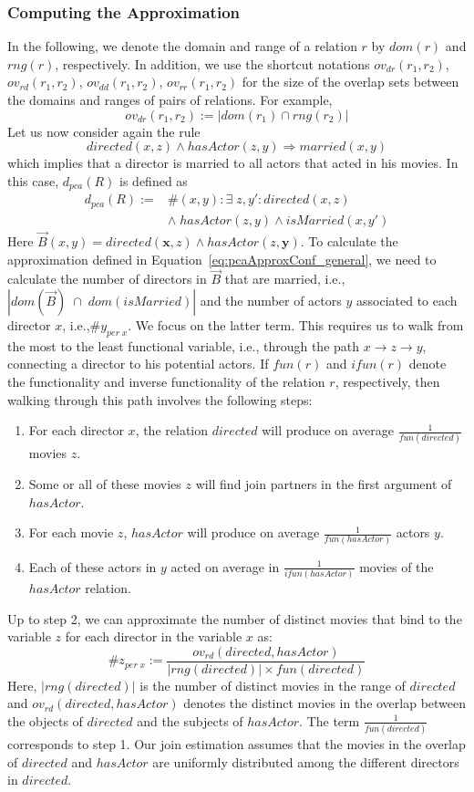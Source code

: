 \subsubsection{Computing the Approximation} \label{sec:appr}
In the following, we denote the domain and range of a relation $r$ by $dom(r)$ and $rng(r)$, respectively.
In addition, we use the shortcut notations $ov_{dr}(r_1,r_2)$, $ov_{rd}(r_1,r_2)$, $ov_{dd}(r_1,r_2)$, $ov_{rr}(r_1,r_2)$
for the size of the overlap sets between the domains and ranges
of pairs of relations. For example, \[ov_{dr}(r_1,r_2) := |dom(r_1) \cap rng(r_2)|\]
Let us now consider again the rule
\[
 directed(x,z) \wedge hasActor(z,y) \Rightarrow married(x,y)
\]
which implies that a director is married to all actors that acted in his movies.
In this case, $d_{pca}(R)$ is defined as
\[
\begin{array}{rl}
d_{pca}(R) := &\#(x,y): \exists\; z, y': directed(x,z)  \\
  &\wedge\; hasActor(z,y) \wedge isMarried(x,y') \label{eq:denomPCAExample}
\end{array}
\]
Here $\vec{B}(x, y) = directed(\bm{x},z) \wedge hasActor(z,\bm{y})$.
To calculate the approximation defined in Equation~\ref{eq:pcaApproxConf_general},
we need to calculate the number of directors in $\vec{B}$ that are married, i.e.,
$|dom(\vec{B})\;\cap\;dom(isMarried)|$ and the number of actors $y$
associated to each director $x$, i.e.,$\#y_{per\;x}$.
We focus on the latter term.
This requires us to walk from the most to the least functional variable, i.e., through the path $x \rightarrow z \rightarrow y$, connecting a director to his potential actors.
If $fun(r)$ and $ifun(r)$
denote the functionality and inverse functionality of the relation $r$, respectively, then
walking through this path involves the following steps:
\begin{enumerate} \itemsep +0.3ex
 \item For each director $x$, the relation $directed$ will produce on average $\frac{1}{fun(directed)}$ movies $z$.
 \item Some or all of these movies $z$ will find join partners in the first argument of $hasActor$.
 \item For each movie $z$, $hasActor$ will produce on average $\frac{1}{fun(hasActor)}$ actors $y$.
 \item Each of these actors in $y$ acted on average in  $\frac{1}{ifun(hasActor)}$ movies of the $hasActor$ relation.
\end{enumerate}
Up to step 2, we can approximate the number of distinct movies that bind to the variable $z$ for each director in the variable $x$ as:
$$
\#z_{per \; x} := \frac{ ov_{rd}(directed,hasActor) }{|rng(directed)| \times fun(directed)}
$$
Here, $|rng(directed)|$ is the number of distinct movies in the range of $directed$ and $ov_{rd}(directed,hasActor)$
denotes the distinct movies in the overlap between the objects of $directed$ and the subjects of $hasActor$.
The term $\frac{1}{fun(directed)}$ corresponds to step  1.
Our join estimation assumes that the movies in the overlap of $directed$
and $hasActor$ are uniformly distributed among the different directors in $directed$.

